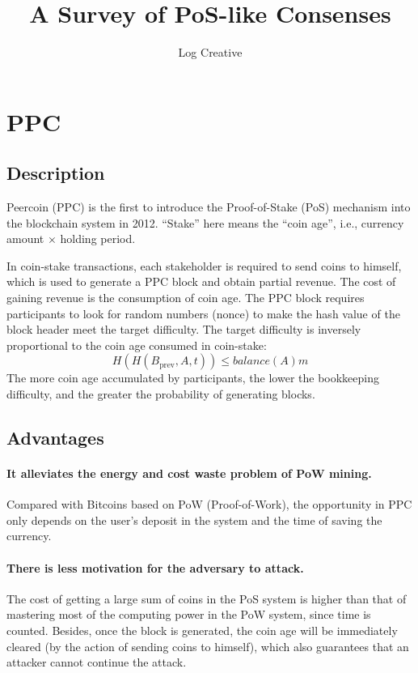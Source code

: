 \documentclass[lang=en]{sjtuarticle}
\title{A Survey of PoS-like Consenses}
\author{Log Creative}
\begin{document}
\maketitle
\section{PPC}
\subsection{Description}
Peercoin (PPC) \cite{ppc} is the first to introduce the Proof-of-Stake (PoS)
mechanism into the blockchain system in 2012. ``Stake'' here means the ``coin age'', i.e., currency amount $\times$ holding period.

In coin-stake transactions, each stakeholder is required to send coins to himself, which is used to generate a PPC block and obtain
partial revenue. The cost of gaining revenue is the consumption of coin age. The
PPC block requires participants to look for random
numbers (nonce) to make the hash value of the block header meet the
target difficulty. The target difficulty is inversely proportional to the coin
age consumed in coin-stake:
\begin{equation}
    H(H(B_\text{prev},A,t))\leq \mathit{balance}(A)m
\end{equation}
The more coin age accumulated by participants, the lower the bookkeeping difficulty,
and the greater the probability of generating blocks.

\subsection{Advantages}

\paragraph{It alleviates the energy and cost waste problem of PoW mining.} Compared with Bitcoins based on PoW (Proof-of-Work), the opportunity in PPC only
depends on the user's deposit in the system and the time of
saving the currency.

\paragraph{There is less motivation for the adversary to attack.} The cost of getting a large sum of coins in the
PoS system is higher than that of mastering most of the
computing power in the PoW system, since time is counted. Besides, once the block is generated, the coin age
will be immediately cleared (by the action of sending coins to himself), which also guarantees that an
attacker cannot continue the attack.
\end{document}
